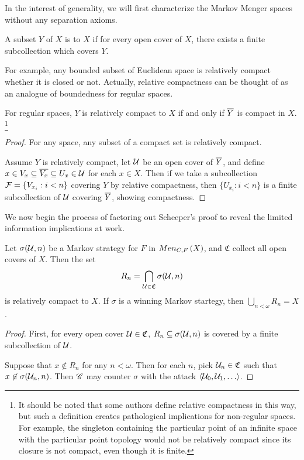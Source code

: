 In the interest of generality, we will first characterize the Markov Menger
spaces without any separation axioms.

\begin{defn}
  A subset $Y$ of $X$ is  to $X$ if for every open
  cover of $X$, there exists a finite subcollection which covers $Y$.
\end{defn}

For example, any bounded subset of Euclidean space is relatively compact
whether it is closed or not. Actually, relative compactness can be thought
of as an analogue of boundedness for regular spaces.

\begin{prop}
  For regular spaces, $Y$ is relatively compact to $X$ if and only if
  $\overline{Y}$ is compact in $X$.
  \footnote{
    It should be noted that some authors define relative compactness in
    this way, but such a definition creates pathological implications for
    non-regular spaces. For example, the singleton containing
    the particular point of an infinite space with the particular point topology
    would not be relatively compact since its closure is not compact, even
    though it is finite.
  }
\end{prop}

\begin{proof}
  For any space, any subset of a compact set is relatively compact.

  Assume $Y$ is relatively compact, let $\mathcal{U}$ be an open cover of $\overline{Y}$,
  and define $x\in V_x\subseteq \overline{V_x}\subseteq U_x \in \mathcal{U}$ for each
  $x\in X$. Then if we take a subcollection $\mathcal{F} = \{V_{x_i} : i<n\}$ covering
  $Y$ by relative compactness, then $\{U_{x_i}:i<n\}$ is a finite subcollection
  of $\mathcal{U}$ covering $\overline{Y}$, showing compactness.
\end{proof}

We now begin the process of factoring out Scheeper's proof to reveal the
limited information implications at work.

\begin{lem}
  Let $\sigma(\mathcal{U}, n)$ be a Markov strategy for $F$ in
  $Men_{C,F}\left({X}\right)$, and $\mathfrak{C}$ collect all open covers of $X$. Then the
  set
    \[
      R_n = \bigcap_{\mathcal{U}\in\mathfrak{C}} \sigma(\mathcal{U},n)
    \]
  is relatively compact to $X$. If $\sigma$ is a winning
  Markov startegy, then $\bigcup_{n<\omega} R_n = X$.
\end{lem}

\begin{proof}
  First, for every open cover $\mathcal{U}\in\mathfrak C$,
  $R_n\subseteq\sigma(\mathcal{U},n)$ is covered by a finite subcollection of $\mathcal{U}$.

  Suppose that $x \not\in R_n$ for any $n<\omega$. Then for each $n$,
  pick $\mathcal{U}_n\in\mathfrak{C}$ such that $x\not\in \sigma(\mathcal{U}_n,n)$. Then
  $\mathscr{C}$ may counter $\sigma$ with the attack $\<\mc U_0,\mc U_1,\dots\>$.
\end{proof}


